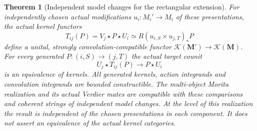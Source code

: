 \documentclass[11pt]{article}
\newtheorem{theorem}{Theorem}[section]
\theoremstyle{definition}
\theoremstyle{remark}
\begin{document}
\begin{theorem}[Independent model changes for the rectangular extension]
\label{thm:independent-curve-descent}
For independently chosen actual modifications
$u_i:M_i'\to M_i$ of these presentations, the actual kernel functors
\[
 T_{ij}(P)=V_j\star P\star U_i
         \simeq R(u_{i,S}\times u_{j,T})_*P
\]
define a unital, strongly convolution-compatible functor
$\mathcal K(\mathbf M')\to\mathcal K(\mathbf M)$.
For every generated $P:(i,S)\to(j,T)$ the actual target counit
\[
 U_j\star T_{ij}(P)\longrightarrow P\star U_i
\]
is an equivalence of kernels. All generated kernels, action
integrands and convolution integrands are bounded constructible.
The multi-object Morita realization and its actual Verdier mates
are compatible with these comparisons and coherent strings of
independent model changes. At the level of this realization the
result is independent of the chosen presentations in each component.
It does not assert an equivalence of the actual kernel categories.
\end{theorem}
\end{document}
